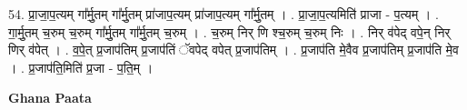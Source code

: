 \documentclass[17pt]{extarticle}
\begin{document}
54. प्रा॒जा॒प॒त्यम् गा᳚र्मु॒तम् गा᳚र्मु॒तम् प्रा॑जाप॒त्यम् प्रा॑जाप॒त्यम् गा᳚र्मु॒तम् । . प्रा॒जा॒प॒त्यमिति॑ प्राजा - प॒त्यम् । . गा॒र्मु॒तम् च॒रुम् च॒रुम् गा᳚र्मु॒तम् गा᳚र्मु॒तम् च॒रुम् । . च॒रुम् निर् णि श्च॒रुम् च॒रुम् निः । . निर् व॑पेद् वपे॒न् निर् णिर् व॑पेत् । . व॒पे॒त् प्र॒जाप॑तिम् प्र॒जाप॑तिं ॅवपेद् वपेत् प्र॒जाप॑तिम् । . प्र॒जाप॑ति मे॒वैव प्र॒जाप॑तिम् प्र॒जाप॑ति मे॒व । . प्र॒जाप॑ति॒मिति॑ प्र॒जा - प॒ति॒म् । \newline

\textbf{Ghana Paata } \newline
\end{document}
